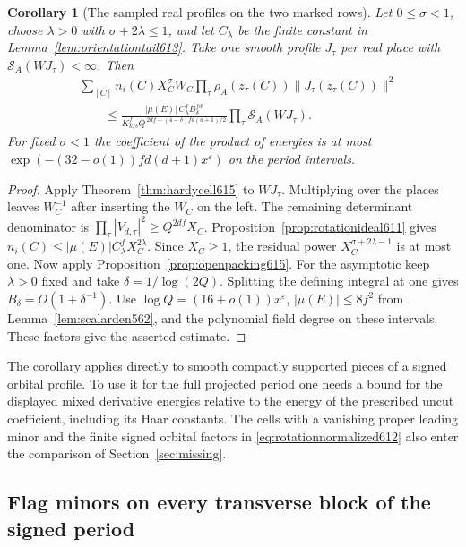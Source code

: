 \documentclass[a4paper,11pt]{article}
\newtheorem{corollary}[proposition]{Corollary}
\theoremstyle{definition}
\theoremstyle{remark}
\numberwithin{equation}{section}
\begin{document}
\begin{corollary}[The sampled real profiles on the two marked rows]
\leavevmode\label{cor:openprofiles615}
Let \(0\le\sigma<1\), choose \(\lambda>0\) with
\(\sigma+2\lambda\le1\), and let \(C_\lambda\) be the finite
constant in Lemma~\ref{lem:orientationtail613}. Take one smooth
profile \(J_\tau\) per real place with
\(\mathcal S_A(WJ_\tau)<\infty\). Then
\begin{align*}
 &\sum_{[C]}n_i(C)X_C^\sigma W_C
       \prod_\tau \rho_A(z_\tau(C))\|J_\tau(z_\tau(C))\|^2\\
 &\qquad\le
 \frac{|\mu(E)|\,C_\lambda^f B_\delta^{fd}}
      {K_{k,s}^f Q^{\,2df+(4-\delta)fd(d+1)/2}}
             \prod_\tau\mathcal S_A(WJ_\tau).
\end{align*}
For fixed \(\sigma<1\) the coefficient of the product of
energies is at most
\(\exp(-(32-o(1))fd(d+1)x^\varepsilon)\) on the period
intervals.
\end{corollary}
\begin{proof}
Apply Theorem~\ref{thm:hardycell615} to \(WJ_\tau\).
Multiplying over the places leaves \(W_C^{-1}\) after inserting
the \(W_C\) on the left. The remaining determinant denominator
is \(\prod_\tau |V_{d,\tau}|^2\ge Q^{2df}X_C\).
Proposition~\ref{prop:rotationideal611} gives
\(n_i(C)\le|\mu(E)|C_\lambda^f X_C^{2\lambda}\).
Since \(X_C\ge1\), the residual power
\(X_C^{\sigma+2\lambda-1}\) is at most one. Now apply
Proposition~\ref{prop:openpacking615}. For the asymptotic
keep \(\lambda>0\) fixed and take \(\delta=1/\log(2Q)\).
Splitting the defining integral at one gives
\(B_\delta=O(1+\delta^{-1})\). Use
\(\log Q=(16+o(1))x^\varepsilon\),
\(|\mu(E)|\le8f^2\) from Lemma~\ref{lem:scalarden562}, and the
polynomial field degree on these intervals. These factors
give the asserted estimate.
\end{proof}

The corollary applies directly to smooth compactly supported
pieces of a signed orbital profile. To use it for the full
projected period one needs a bound for the displayed mixed
derivative energies relative to the energy of the prescribed
uncut coefficient, including its Haar constants. The cells
with a vanishing proper leading minor and the finite signed
orbital factors in \eqref{eq:rotationnormalized612} also enter
the comparison of Section~\ref{sec:missing}.


\subsection{Flag minors on every transverse block of the signed period}
\label{sec:pivotperiod619}
\end{document}

